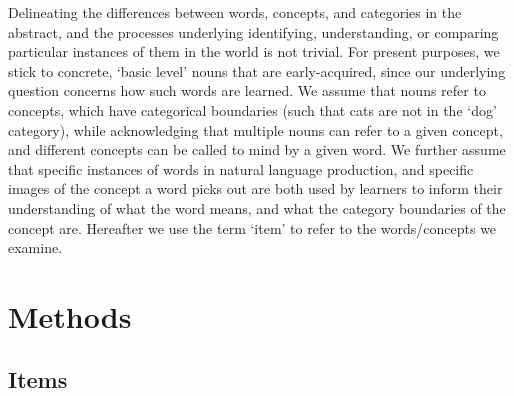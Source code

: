 \documentclass[10pt, letterpaper]{article}
\begin{document}
Delineating the differences between words, concepts, and categories in
the abstract, and the processes underlying identifying, understanding,
or comparing particular instances of them in the world is not trivial.
For present purposes, we stick to concrete, `basic level' nouns that are
early-acquired, since our underlying question concerns how such words
are learned. We assume that nouns refer to concepts, which have
categorical boundaries (such that cats are not in the `dog' category),
while acknowledging that multiple nouns can refer to a given concept,
and different concepts can be called to mind by a given word. We further
assume that specific instances of words in natural language production,
and specific images of the concept a word picks out are both used by
learners to inform their understanding of what the word means, and what
the category boundaries of the concept are. Hereafter we use the term
`item' to refer to the words/concepts we examine.

\section{Methods}\label{methods}

\subsection{Items}\label{items}
\end{document}
